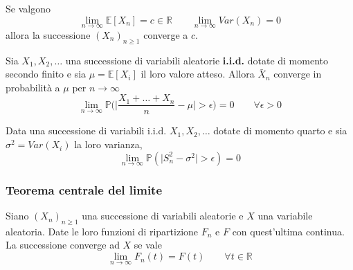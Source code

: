 \begin{proposition}
	Se valgono
	\begin{equation}
		\lim_{n \to \infty} \mathbb{E}[X_n] = c \in \mathbb{R} \quad\quad \lim_{n \to \infty} Var(X_n) = 0
	\end{equation}
	allora la successione $(X_n)_{n \geq 1}$ converge a $c$.
\end{proposition}

\begin{theorem}
	Sia $X_1, X_2, \ldots$ una successione di variabili aleatorie \textbf{i.i.d.} dotate di momento secondo finito e sia $\mu = \mathbb{E}[X_i]$ il loro valore atteso. Allora $\bar{X}_n$ converge in probabilità a $\mu$ per $n \to \infty$
	\begin{equation}
		\lim_{n \to \infty}\mathbb{P}\bigg(\bigg\lvert\frac{X_1 + \ldots + X_n}{n}-\mu\bigg\rvert>\epsilon\bigg) = 0 \quad\quad \forall \epsilon > 0
	\end{equation}
\end{theorem}

\begin{proposition}
	Data una successione di variabili i.i.d. $X_1, X_2, \ldots$ dotate di momento quarto e sia $\sigma^2 = Var(X_i)$ la loro varianza,
	\begin{equation}
		\lim_{n \to \infty} \mathbb{P}(\lvert S^2_n - \sigma^2\rvert > \epsilon)=0
	\end{equation}
\end{proposition}

\subsubsection{Teorema centrale del limite}
\begin{proposition}
	Siano $(X_n)_{n \geq 1}$ una successione di variabili aleatorie e $X$ una variabile aleatoria. Date le loro funzioni di ripartizione $F_n$ e $F$ con quest'ultima continua. La successione converge ad $X$ se vale
	\begin{equation}
		\lim_{n \to \infty} F_n(t)=F(t) \quad\quad \forall t \in \mathbb{R}
	\end{equation}
\end{proposition}


